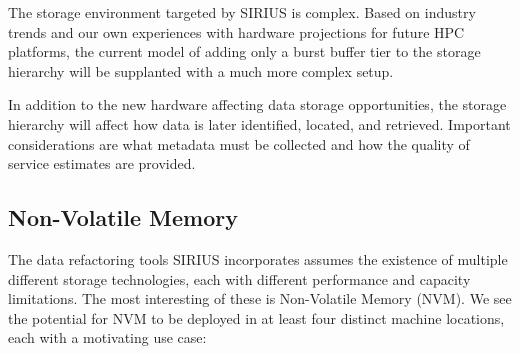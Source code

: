 

The storage environment targeted by SIRIUS is complex. Based on industry trends
and our own experiences with hardware projections for future HPC platforms, the
current model of adding only a burst buffer tier to the storage hierarchy will
be supplanted with a much more complex setup.

In addition to the new hardware affecting data storage opportunities, the
storage hierarchy will affect how data is later identified, located, and
retrieved. Important considerations are what metadata must be collected and
how the quality of service estimates are provided.

\subsection{Non-Volatile Memory}

The data refactoring tools SIRIUS incorporates assumes the existence of
multiple different storage technologies, each with different performance and
capacity limitations. The most interesting of these is Non-Volatile Memory
(NVM). We see the potential for NVM to be deployed in at least four distinct
machine locations, each with a motivating use case:

